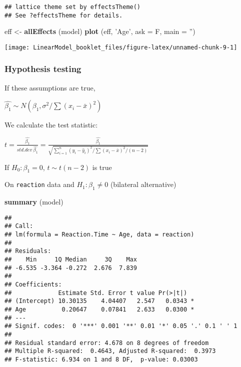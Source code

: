 \documentclass[
]{article}
\newenvironment{Shaded}{\begin{snugshade}}{\end{snugshade}}
\newcommand{\DataTypeTok}[1]{\textcolor[rgb]{0.13,0.29,0.53}{#1}}
\newcommand{\KeywordTok}[1]{\textcolor[rgb]{0.13,0.29,0.53}{\textbf{#1}}}
\newcommand{\NormalTok}[1]{#1}
\newcommand{\StringTok}[1]{\textcolor[rgb]{0.31,0.60,0.02}{#1}}
\begin{document}
\begin{verbatim}
## lattice theme set by effectsTheme()
## See ?effectsTheme for details.
\end{verbatim}

\begin{Shaded}
\begin{Highlighting}[]
\NormalTok{eff <-}\StringTok{ }\KeywordTok{allEffects}\NormalTok{ (model)}
\KeywordTok{plot}\NormalTok{ (eff, }\StringTok{'Age'}\NormalTok{, }\DataTypeTok{ask =}\NormalTok{ F, }\DataTypeTok{main =} \StringTok{''}\NormalTok{)}
\end{Highlighting}
\end{Shaded}

\begin{center}\texttt{[image: LinearModel\_booklet\_files/figure-latex/unnamed-chunk-9-1]} \end{center}

\hypertarget{hypothesis-testing}{%
\subsubsection{Hypothesis testing}\label{hypothesis-testing}}

If these assumptions are true,

\(\hat{\beta_1} \sim N (\beta_1, \sigma ^ 2 / \sum (x_i- \bar{x}) ^ 2)\)

We calculate the test statistic:

\(t=\frac{\hat{\beta_1}}{std.dev\ \hat{\beta_1}}=\frac{\hat{\beta_1}}{\sqrt{\sum_{i=1} ^ n (y_i- \hat{y}_i) ^ 2 / \sum (x_i- \bar{x}) ^ 2 / (n-2)}}\)

If \(H_0: \beta_1=0\), \(t \sim t (n-2)\) is true

On \texttt{reaction} data and \(H_1: \beta_1 \neq 0\) (bilateral
alternative)

\begin{Shaded}
\begin{Highlighting}[]
\KeywordTok{summary}\NormalTok{ (model)}
\end{Highlighting}
\end{Shaded}

\begin{verbatim}
## 
## Call:
## lm(formula = Reaction.Time ~ Age, data = reaction)
## 
## Residuals:
##    Min     1Q Median     3Q    Max 
## -6.535 -3.364 -0.272  2.676  7.839 
## 
## Coefficients:
##             Estimate Std. Error t value Pr(>|t|)  
## (Intercept) 10.30135    4.04407   2.547   0.0343 *
## Age          0.20647    0.07841   2.633   0.0300 *
## ---
## Signif. codes:  0 '***' 0.001 '**' 0.01 '*' 0.05 '.' 0.1 ' ' 1
## 
## Residual standard error: 4.678 on 8 degrees of freedom
## Multiple R-squared:  0.4643, Adjusted R-squared:  0.3973 
## F-statistic: 6.934 on 1 and 8 DF,  p-value: 0.03003
\end{verbatim}
\end{document}
